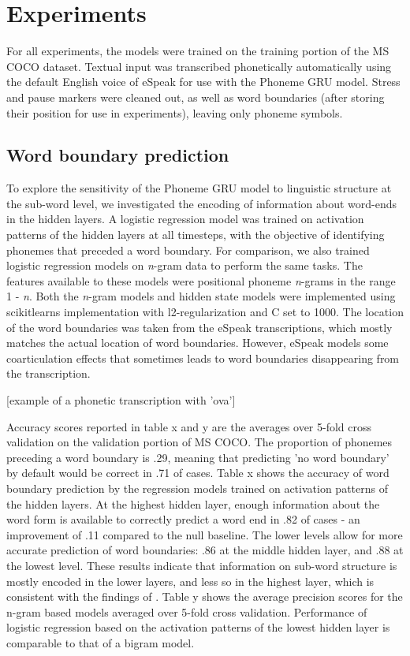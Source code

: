 \section{Experiments}
\label{sec:experiments}

For all experiments, the models were trained on the training portion %
of the MS COCO dataset. Textual input was transcribed phonetically automatically using the default English voice of eSpeak for use with the {\sc Phoneme GRU} model.
Stress and pause markers were cleaned out, as well as word boundaries (after storing their position for use in experiments), leaving only phoneme symbols. %

\subsection{Word boundary prediction}
To explore the sensitivity of the {\sc Phoneme GRU} model to linguistic structure at the sub-word level, we investigated the encoding of information about word-ends in the hidden layers. A logistic regression model was trained on activation patterns of the hidden layers at all timesteps, with the objective of identifying phonemes that preceded a word boundary. For comparison, we also trained logistic regression models on \textit{n}-gram data to perform the same tasks. The features available to these models were positional phoneme \textit{n}-grams in the range 1 - \textit{n}. Both the \textit{n}-gram models and hidden state models were implemented using scikitlearns implementation with l2-regularization and C set to 1000. The location of the word boundaries was taken from the eSpeak transcriptions, which mostly matches the actual location of word boundaries. However, eSpeak models some coarticulation effects that sometimes leads to word boundaries disappearing from the transcription.

[example of a phonetic transcription with 'ova']

Accuracy scores reported in table x and y are the averages over 5-fold cross validation on the validation portion of MS COCO. The proportion of phonemes preceding a word boundary is .29, meaning that predicting 'no word boundary' by default would be correct in .71 of cases. 
Table x shows the accuracy of word boundary prediction by the regression models trained on activation patterns of the hidden layers. At the highest hidden layer, enough information about the word form is available to correctly predict a word end in .82 of cases - an improvement of .11 compared to the null baseline. The lower levels allow for more accurate prediction of word boundaries: .86 at the middle hidden layer, and .88 at the lowest level. These results indicate that information on sub-word structure is mostly encoded in the lower layers, and less so in the highest layer, which is consistent with the findings of . 
Table y shows the average precision scores for the n-gram based models averaged over 5-fold cross validation. Performance of logistic regression based on the activation patterns of the lowest hidden layer is comparable to that of a bigram model. 

